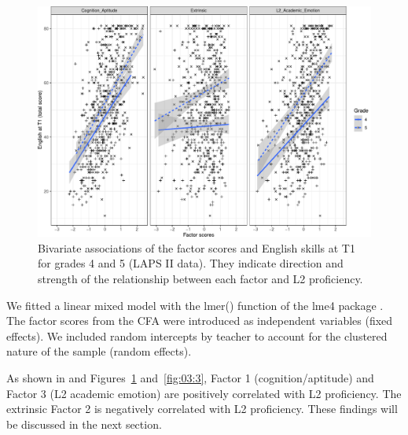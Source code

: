 \documentclass[output=paper]{langsci/langscibook}
\begin{document}
  
\begin{figure}
\includegraphics[width=\textwidth]{figures/Figure3.2.pdf}
\caption{\label{fig:03:2}Bivariate associations of the factor scores and English skills at T1 for grades 4 and 5 (LAPS II data). They indicate direction and strength of the relationship between each factor and L2 proficiency.}
\end{figure}

We fitted a linear mixed model with the lmer() function of the lme4 package \citep{BatesEtAl2015}. The factor scores from the CFA were introduced as independent variables (fixed effects). We included random intercepts by teacher to account for the clustered nature of the sample (random effects). 

As shown in  and Figures~\ref{fig:03:2} and~\ref{fig:03:3}, Factor 1 (cognition/aptitude) and Factor 3 (L2 academic emotion) are positively correlated with L2 proficiency. The extrinsic Factor 2 is negatively correlated with L2 proficiency. These findings will be discussed in the next section. 


\begin{table}
\small
\caption{\label{tab:03:3}Summary of the regression model of the factor scores on English proficiency at T1}
\end{table}
  
\end{document}
